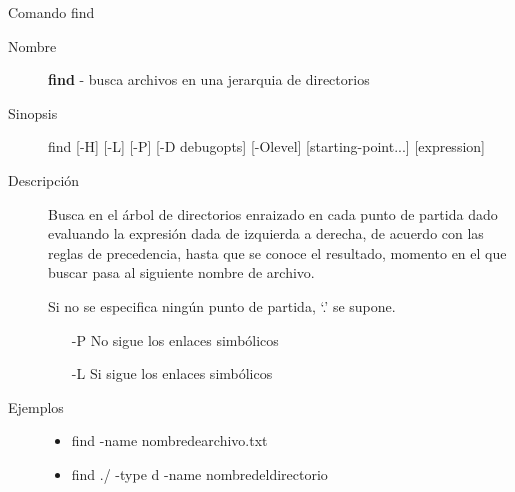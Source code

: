 \begin{frame}[c]{Comando find}
  \begin{description}
    \item[Nombre]
      \textbf{find} - busca archivos en una jerarquia de directorios

    \vspace{\baselineskip}
    \item[Sinopsis]
      find  [-H]  [-L] [-P] [-D debugopts] [-Olevel] [starting-point...] [expression]
      
    \vspace{\baselineskip}
    \item[Descripción]
      Busca en el árbol de directorios enraizado en cada punto de partida
      dado evaluando la expresión dada de izquierda a derecha, de acuerdo
      con las reglas de precedencia, hasta que se conoce el resultado,
      momento en el que buscar pasa al siguiente nombre de archivo.

      Si no se especifica ningún punto de partida, `.' se supone.

      \begin{itemize}
        \item [-P] No sigue los enlaces simbólicos
        \item [-L] Si sigue los enlaces simbólicos
      \end{itemize}

    \vspace{\baselineskip}
    \item[Ejemplos]
      \begin{itemize}
        \item find -name nombredearchivo.txt 
        \item find ./ -type d -name nombredeldirectorio
      \end{itemize}
  \end{description}
\end{frame}

